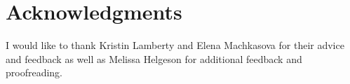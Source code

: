 \documentclass{sig-alternate}
\begin{document}
\section{Acknowledgments}
	I would like to thank Kristin Lamberty and Elena Mach\-kasova for their advice and feedback as well as Melissa Helgeson for additional feedback and proofreading. 




  


%
%
\end{document}
